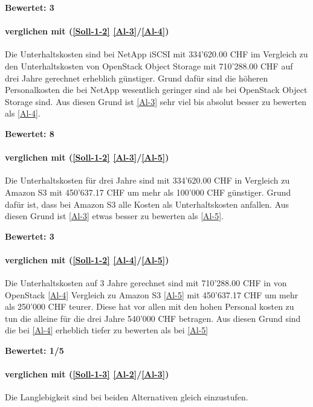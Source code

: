 \textbf{Bewertet: 3}

\paragraph*{  verglichen mit  (\ref{Soll-1-2} \ref{Al-3}/\ref{Al-4})}
Die Unterhaltskosten sind bei NetApp iSCSI mit 334’620.00 CHF im Vergleich zu den Unterhaltskosten von OpenStack Object Storage mit 710’288.00 CHF auf drei Jahre gerechnet erheblich günstiger. Grund dafür sind die höheren Personalkosten die bei NetApp wesentlich geringer sind als bei OpenStack Object Storage sind. Aus diesen Grund ist  \ref{Al-3} sehr viel bis absolut besser zu bewerten als  \ref{Al-4}.

\textbf{Bewertet: 8}

\paragraph*{  verglichen mit  (\ref{Soll-1-2} \ref{Al-3}/\ref{Al-5})}
Die Unterhaltskosten für drei Jahre sind mit 334’620.00 CHF in Vergleich zu Amazon S3 mit 450'637.17 CHF um mehr als 100'000 CHF günstiger. Grund dafür ist, dass bei Amazon S3 alle Kosten als Unterhaltskosten anfallen.
Aus diesen Grund ist  \ref{Al-3} etwas besser zu bewerten als  \ref{Al-5}.

\textbf{Bewertet: 3}


\paragraph*{  verglichen mit  (\ref{Soll-1-2} \ref{Al-4}/\ref{Al-5})}

Die Unterhaltskosten auf 3 Jahre gerechnet sind mit 710’288.00 CHF in von OpenStack \ref{Al-4} Vergleich zu Amazon S3 \ref{Al-5} mit 450’637.17 CHF um mehr als 250'000 CHF teurer. Diese hat vor allen mit den hohen Personal kosten zu tun die alleine für die drei Jahre 540'000 CHF betragen. Aus diesen Grund sind die  bei \ref{Al-4} erheblich tiefer zu bewerten als bei \ref{Al-5}

\textbf{Bewertet: 1/5}


\paragraph*{  verglichen mit  (\ref{Soll-1-3} \ref{Al-2}/\ref{Al-3})}
Die Langlebigkeit sind bei beiden Alternativen gleich einzustufen.


